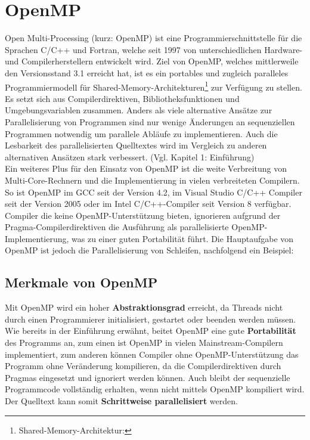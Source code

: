 \documentclass{scrartcl}
\begin{document}
\setcounter{page}{1} %
\section{OpenMP}
Open Multi-Processing (kurz: OpenMP) ist eine Programmierschnittstelle für die Sprachen C/C++ und Fortran, welche seit 1997 von unterschiedlichen Hardware- und Compilerherstellern entwickelt wird. Ziel von OpenMP, welches mittlerweile den Versionsstand 3.1 erreicht hat, ist es ein portables und zugleich paralleles Programmiermodell für Shared-Memory-Architekturen\footnote{Shared-Memory-Architektur: } zur Verfügung zu stellen. Es setzt sich aus Compilerdirektiven, Bibliotheksfunktionen und Umgebungsvariablen zusammen. Anders als viele alternative Ansätze zur Parallelisierung von Programmen sind nur wenige Änderungen an sequenziellen Programmen notwendig um parallele Abläufe zu implementieren. Auch die Lesbarkeit des parallelisierten Quelltextes wird im Vergleich zu anderen alternativen Ansätzen stark verbessert. (Vgl. \cite{omp08} Kapitel 1: Einführung) \\
Ein weiteres Plus für den Einsatz von OpenMP ist die weite Verbreitung von Multi-Core-Rechnern und die Implementierung in vielen verbreiteten Compilern. So ist OpenMP im GCC seit der Version 4.2, im Visual Studio C/C++ Compiler seit der Version 2005 oder im Intel C/C++-Compiler seit Version 8 verfügbar. Compiler die keine OpenMP-Unterstützung bieten, ignorieren aufgrund der Pragma-Compilerdirektiven die Ausführung als parallelisierte OpenMP-Implementierung, was zu einer guten Portabilität führt. Die Hauptaufgabe von OpenMP ist jedoch die Parallelisierung von Schleifen, nachfolgend ein Beispiel: \\


\subsection{Merkmale von OpenMP}

Mit OpenMP wird ein hoher \textbf{Abstraktionsgrad} erreicht, da Threads nicht durch einen Programmierer initialisiert, gestartet oder beenden werden müssen. Wie bereits in der Einführung erwähnt, beitet OpenMP eine gute \textbf{Portabilität} des Programms an, zum einen ist OpenMP in vielen Mainstream-Compilern implementiert, zum anderen können Compiler ohne OpenMP-Unterstützung das Programm ohne Veränderung kompilieren, da die Compilerdirektiven durch Pragmas eingesetzt und ignoriert werden können. Auch bleibt der sequenzielle Programmcode vollständig erhalten, wenn nicht mittels OpenMP kompiliert wird. Der Quelltext kann somit \textbf{Schrittweise parallelisiert} werden. \\
\end{document}

